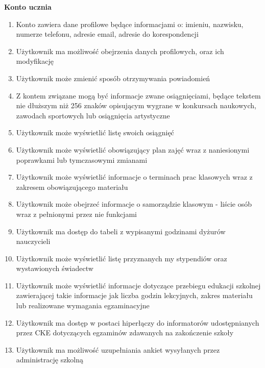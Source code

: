 \documentclass{article}
\begin{document}
\textbf{Konto ucznia}
\begin{enumerate}
	\item Konto zawiera dane profilowe będące informacjami o: imieniu, nazwisku, numerze telefonu, adresie email, adresie do korespondencji
	\item Użytkownik ma możliwość obejrzenia danych profilowych, oraz ich modyfikację
	\item Użytkownik może zmienić sposób otrzymywania powiadomień
	\item Z kontem związane mogą być informacje zwane osiągnięciami, będące tekstem nie dłuższym niż 256 znaków opisującym wygrane w konkursach naukowych, zawodach sportowych lub osiągnięcia artystyczne
	\item Użytkownik może wyświetlić listę swoich osiągnięć
	\item Użytkownik może wyświetlić obowiązujący plan zajęć wraz z naniesionymi poprawkami lub tymczasowymi zmianami
	\item Użytkownik może wyświetlić informacje o terminach prac klasowych wraz z zakresem obowiązującego materiału
	\item Użytkownik może obejrzeć informacje o samorządzie klasowym - liście osób wraz z pełnionymi przez nie funkcjami
	\item Użytkownik ma dostęp do tabeli z wypisanymi godzinami dyżurów nauczycieli
	\item Użytkownik może wyświetlić listę przyznanych my stypendiów oraz wystawionych świadectw
	\item Użytkownik może wyświetlić informacje dotyczące przebiegu edukacji szkolnej zawierającej takie informacje jak liczba godzin lekcyjnych, zakres materiału lub realizowane wymagania egzaminacyjne
	\item Użytkownik ma dostęp w postaci hiperłączy do informatorów udostępnianych przez CKE dotyczących egzaminów zdawanych na zakończenie szkoły
	\item Użytkownik ma możliwość uzupełniania ankiet wysyłanych przez administrację szkolną

\end{enumerate}
\end{document}
